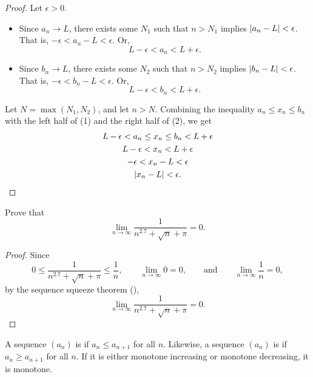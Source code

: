 \begin{proof}
  Let $\epsilon > 0$.
  \begin{itemize}
    \item Since $a_n \to L$, there exists some $N_1$ such that $n >
      N_1$ implies $| a_n - L | < \epsilon$. That is, $-\epsilon <
      a_n - L < \epsilon$. Or,
      \[ L - \epsilon < a_n < L + \epsilon. \tag{1} \]

    \item Since $b_n \to L$, there exists some $N_2$ such that $n >
      N_2$ implies $| b_n - L | < \epsilon$. That is, $-\epsilon <
      b_n - L < \epsilon$. Or,
      \[ L - \epsilon < b_n < L + \epsilon. \tag{2} \]
  \end{itemize}

  Let $N = \max(N_1, N_2)$, and let $n > N$. Combining the
  inequality $a_n \leq x_n \leq b_n$ with the left half of (1) and
  the right half of (2), we get
  \begin{gather*}
    L - \epsilon < a_n \leq x_n \leq b_n < L + \epsilon \\
    L - \epsilon < x_n < L + \epsilon \\
    -\epsilon < x_n - L < \epsilon \\
    | x_n - L | < \epsilon.
  \end{gather*}
  \vspace{-1em}
\end{proof}

\begin{example}
  Prove that
  \[ \lim_{n \to \infty} \frac{1}{n^{2.7} + \sqrt{n} + \pi} = 0. \]

  \begin{proof}
    Since
    \[ 0 \leq \frac{1}{n^{2.7} + \sqrt{n} + \pi} \leq \frac{1}{n},
      \qquad \lim_{n \to \infty} 0 = 0, \qquad \text{and} \qquad \lim_{n
    \to \infty} \frac{1}{n} = 0, \]
    by the sequence squeeze theorem (),
    \[ \lim_{n \to \infty} \frac{1}{n^{2.7} + \sqrt{n} + \pi} = 0. \]
  \end{proof}
\end{example}

\begin{definition}
  A sequence $(a_n)$ is  if $a_n \leq a_{n
  + 1}$ for all $n$. Likewise, a sequence $(a_n)$ is  if $a_n \geq a_{n + 1}$ for all $n$. If it is either
  monotone increasing or monotone decreasing, it is monotone.
\end{definition}

